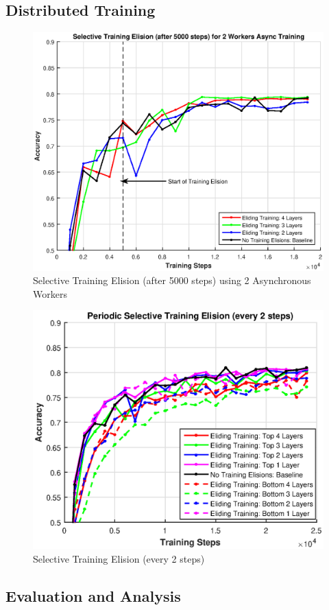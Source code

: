 \subsection{Distributed Training}




\begin{figure}[t]
	\centering
	\includegraphics[width=0.8\columnwidth]{figures/approx-2workers.eps}
	\caption{Selective Training Elision (after 5000 steps) using 2 Asynchronous Workers}
	\label{fig:approx-2-workers}
\end{figure}

\begin{figure}[t]
	\centering
	\includegraphics[width=0.8\columnwidth]{figures/combined_bottom_top_elisions.eps}
	\caption{Selective Training Elision (every 2 steps)}
	\label{fig:combined-alt}
\end{figure}
\subsection{Evaluation and Analysis}

